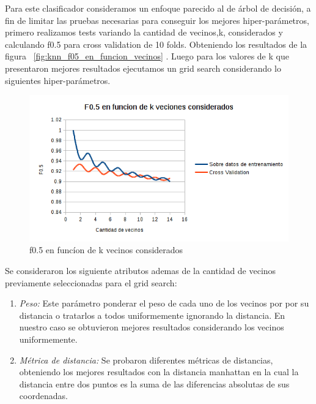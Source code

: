 Para este clasificador consideramos un enfoque parecido al de árbol de decisión, a fin de limitar las pruebas necesarias para conseguir los mejores hiper-parámetros, primero realizamos tests variando la cantidad de vecinos,k, considerados y calculando f0.5 para cross validation de 10 folds. Obteniendo los resultados de la figura ~\ref{fig:knn_f05_en_funcion_vecinos} .
Luego para los valores de k que presentaron mejores resultados ejecutamos un grid search considerando lo siguientes hiper-parámetros. 
\begin{figure}[H]
    \centering
        \includegraphics[width=\textwidth]{plots/knn_f05_en_funcion_vecinos.png}
        \caption{f0.5 en funcíon de k vecinos considerados}
        \label{fig:arboles_f05_en_funcion_altura}
\end{figure}
    Se consideraron los siguiente atributos ademas de la cantidad de vecinos previamente seleccionadas para el grid search:
 \begin{enumerate}
\item \textit{Peso:} Este parámetro ponderar el peso de cada uno de los vecinos por por su distancia o tratarlos a todos uniformemente ignorando la distancia. En nuestro caso se obtuvieron mejores resultados considerando los vecinos uniformemente.  
\item \textit{Métrica de distancia:} Se probaron diferentes métricas de distancias, obteniendo los mejores resultados con la distancia manhattan en la cual la distancia entre dos puntos es la suma de las diferencias absolutas de sus coordenadas.
\end{enumerate}